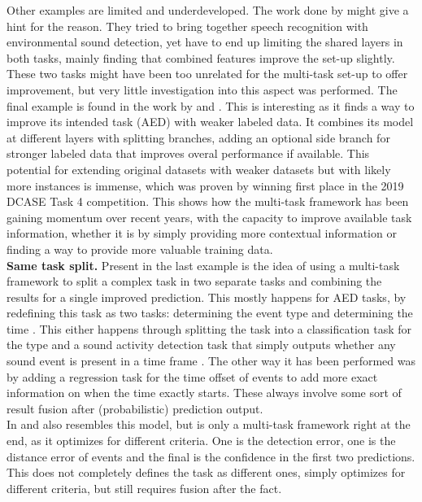 Other examples are limited and underdeveloped.  The work done by \cite{sakti2016deep} might give a hint for the reason. They tried to bring together speech recognition with environmental sound detection, yet have to end up limiting the shared layers in both tasks, mainly finding that combined features improve the set-up slightly. These two tasks might have been too unrelated for the multi-task set-up to offer improvement, but very little investigation into this aspect was performed. The final example is found in the work by \cite{huang2020guided} and \cite{huang2020multi}. This is interesting as it finds a way to improve its intended task (AED) with weaker labeled data. It combines its model at different layers with splitting branches, adding an optional side branch for stronger labeled data that improves overal performance if available. This potential for extending original datasets with weaker datasets but with likely more instances is immense, which was proven by winning first place in the 2019 DCASE Task 4 competition. This shows how the multi-task framework has been gaining momentum over recent years, with the capacity to improve available task information, whether it is by simply providing more contextual information or finding a way to provide more valuable training data.\\



\textbf{Same task split.} Present in the last example \cite{huang2020guided} is the idea of using a multi-task framework to split a complex task in two separate tasks and combining the results for a single improved prediction. This mostly happens for AED tasks, by redefining this task as two tasks: determining the event type and determining the time . This either happens through splitting the task into a classification task for the type and a sound activity detection task that simply outputs whether any sound event is present in a time frame \citep{morfi2018deep} \citep{pankajakshan2019polyphonic}. The other way it has been performed was by adding a regression task for the time offset of events to add more exact information on when the time exactly starts. These always involve some sort of result fusion after (probabilistic) prediction output. \\

In \cite{phan2017dnn} and \cite{phan2019unifying} also resembles this model, but is only a multi-task framework right at the end, as it optimizes for different criteria. One is the detection error, one is the distance error of events and the final is the confidence in the first two predictions. This does not completely defines the task as different ones, simply optimizes for different criteria, but still requires fusion after the fact. \\

